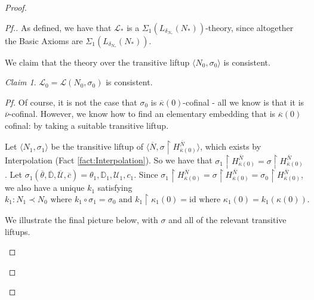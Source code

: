 \documentclass{amsart}
\theoremstyle{definition}
\theoremstyle{remark}
\newtheorem{claimno}{Claim}
\newcommand{\D}{\mathbb{D}}
\newcommand{\N}{{\overline{N}}}
\newcommand{\U}{\mathcal{U}}
\DeclareMathOperator{\otp}{otp}
\newcommand{\rest}{\mathbin{\upharpoonright}}
\begin{document}
\begin{proof}
\begin{proof}[Pf.]
As defined, we have that $\mathcal L_*$ is a $\Sigma_1(L_{\delta_{N_*}}(N_*))$-theory, since altogether the \textsf{Basic Axioms} are $\Sigma_1(L_{\delta_{N_*}}(N_*))$.

We claim that the theory over the transitive liftup $\langle N_0, \sigma_0\rangle$ is consistent.

\begin{claimno} $\mathcal L_0=\mathcal L(N_0, \sigma_0)$ is consistent. \end{claimno}
\begin{proof}[Pf] Of course, it is not the case that $\sigma_0$ is $\overline \kappa(0)$-cofinal - all we know is that it is $\overline \nu$-cofinal. However, we know how to find an elementary embedding that is $\overline \kappa(0)$ cofinal: by taking a suitable transitive liftup.

Let $\langle N_1, \sigma_1 \rangle$ be the transitive liftup of $\langle \N, \sigma \rest H^{\N}_{\overline \kappa(0)} \rangle$, which exists by Interpolation (Fact \ref{fact:Interpolation}). So we have that $\sigma_1 \rest H^\N_{\overline \kappa(0)} = \sigma \rest H^\N_{\overline \kappa(0)}$. Let $\sigma_1(\overline \theta, \overline{\D}, \overline{\U}, \overline c) = \theta_1, \D_1, \U_1, c_1.$ 
Since $\sigma_1 \rest H^\N_{\overline \kappa(0)} = \sigma \rest H^\N_{\overline \kappa(0)} = \sigma_0 \rest H^\N_{\overline \kappa(0)}$, we also have a unique $k_1$ satisfying $ \text{$k_1: N_1 \prec N_0$ where $k_1\circ \sigma_1 = \sigma_0$ and $k_1 \rest \kappa_1(0) = \text{id}$ where $\kappa_1(0)=k_1(\kappa(0))$.}$ 

We illustrate the final picture below, with $\sigma$ and all of the relevant transitive liftups.
\begin{center}
\end{center}
\end{proof}
\end{proof}
\end{proof}
\end{document}
